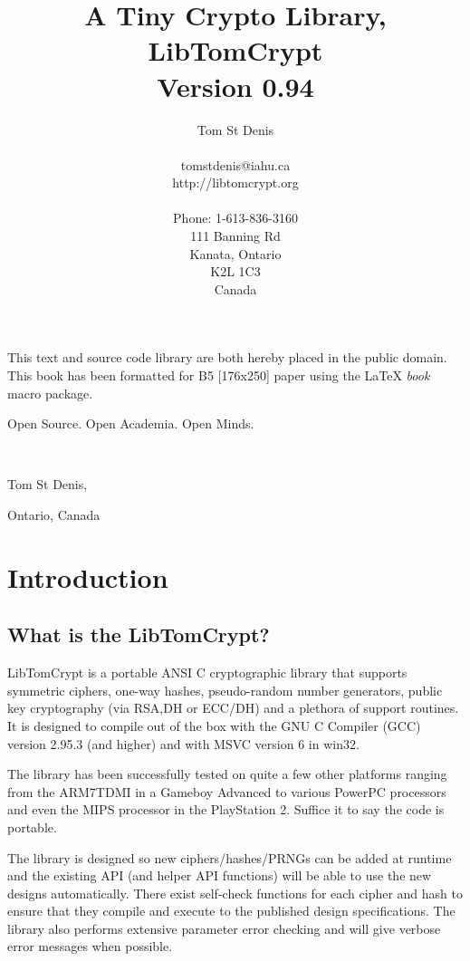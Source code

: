 \documentclass[b5paper]{book}
\begin{document}
\title{A Tiny Crypto Library, \\ LibTomCrypt \\ Version 0.94}
\author{Tom St Denis \\
\\
tomstdenis@iahu.ca \\
http://libtomcrypt.org \\ \\
Phone: 1-613-836-3160\\
111 Banning Rd \\
Kanata, Ontario \\
K2L 1C3 \\
Canada
}
\maketitle
This text and source code library are both hereby placed in the public domain.  This book has been 
formatted for B5 [176x250] paper using the \LaTeX{} {\em book} macro package.

\vspace{10cm}

\begin{flushright}Open Source.  Open Academia.  Open Minds.

\mbox{ }

Tom St Denis,

Ontario, Canada
\end{flushright}
\newpage
\tableofcontents
\chapter{Introduction}
\section{What is the LibTomCrypt?}
LibTomCrypt is a portable ANSI C cryptographic library that supports symmetric ciphers, one-way hashes, 
pseudo-random number generators, public key cryptography (via RSA,DH or ECC/DH) and a plethora of support 
routines.  It is designed to compile out of the box with the GNU C Compiler (GCC) version 2.95.3 (and higher) 
and with MSVC version 6 in win32.

The library has been successfully tested on quite a few other platforms ranging from the ARM7TDMI in a 
Gameboy Advanced to various PowerPC processors and even the MIPS processor in the PlayStation 2.  Suffice it
to say the code is portable.

The library is designed so new ciphers/hashes/PRNGs can be added at runtime and the existing API (and helper API functions) will 
be able to use the new designs automatically.  There exist self-check functions for each cipher and hash to ensure that
they compile and execute to the published design specifications.  The library also performs extensive parameter error checking
and will give verbose error messages when possible.
\end{document}
